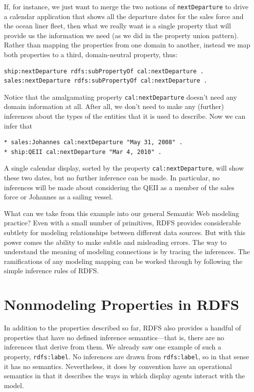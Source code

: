 If, for instance, we just want to merge the two notions of \texttt{nextDeparture}
to drive a calendar application that shows all the departure dates for
the sales force and the ocean liner fleet, then what we really want is a
single property that will provide us the information we need (as we did
in the property union pattern). Rather than mapping the properties from
one domain to another, instead we map both properties to a third,
domain-neutral property, thus:

\begin{lstlisting}
ship:nextDeparture rdfs:subPropertyOf cal:nextDeparture .
sales:nextDeparture rdfs:subPropertyOf cal:nextDeparture .
\end{lstlisting}

Notice that the amalgamating property \texttt{cal:nextDeparture} doesn't need any
domain information at all. After all, we don't need to make any
(further) inferences about the types of the entities that it is used to
describe. Now we can infer that

\begin{lstlisting}
* sales:Johannes cal:nextDeparture "May 31, 2008" .
* ship:QEII cal:nextDeparture "Mar 4, 2010" .
\end{lstlisting}

A single calendar display, sorted by the property \texttt{cal:nextDeparture},
will show these two dates, but no further inference can be made. In
particular, no inferences will be made about considering the QEII as a
member of the sales force or Johannes as a sailing vessel.

What can we take from this example into our general Semantic Web
modeling practice? Even with
a small number of primitives, RDFS provides considerable subtlety for
modeling relationships between different data sources. But with this
power comes the ability to make subtle and misleading errors. The way to
understand the meaning of modeling connections is by tracing the
inferences. The ramifications of any modeling mapping can be worked
through by following the simple inference rules of RDFS.

\section{Nonmodeling Properties in RDFS}

In addition to the properties described so far, RDFS also provides a
handful of properties that have no defined inference semantics---that
is, there are no inferences that derive from them. We already saw one
example of such a property, \texttt{rdfs:label}. No inferences are drawn from
\texttt{rdfs:label}, so in that sense it has no semantics. Nevertheless, it does
by convention have an operational semantics in that it describes the
ways in which display agents interact with the model.

